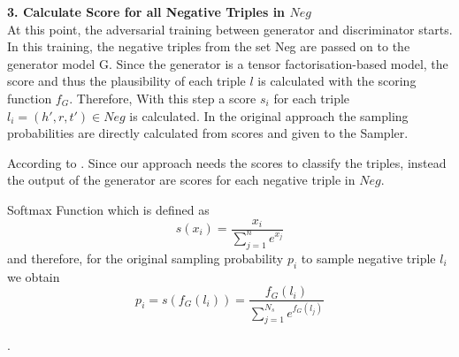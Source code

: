 \textbf{3. Calculate Score for all Negative Triples in $Neg$}\\

At this point, the adversarial training between generator and discriminator starts.
In this training, the negative triples from the set Neg are passed on to the generator model G.
Since the generator is a tensor factorisation-based model, the score and thus the plausibility of each triple $l$ is calculated with the scoring function $f_G$.
Therefore, With this step a score $s_i$ for each triple $l_i = (h',r,t') \in Neg$ is calculated.
In the original \kbgan approach the sampling probabilities are directly calculated from scores and given to the Sampler.

According to 
.
Since our approach needs the scores to classify the triples, instead the output of the generator are scores for each negative triple in $Neg$.


Softmax Function which is defined as 
\begin{equation}
    s(x_i) = \frac{x_i}{\sum_{j=1}^{n}{e^{x_j}}}
\end{equation}
and therefore, for the original sampling probability $p_i$ to sample negative triple $l_i$ we obtain 
\begin{equation}
    p_i = s(f_G(l_i)) = \frac{f_G(l_i)}{\sum_{j=1}^{N_s}{e^{f_G(l_j)}}}
\end{equation}

.
